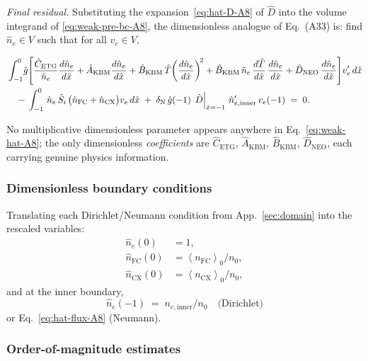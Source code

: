 \documentclass[twocolumn,secnumarabic,amssymb, nobibnotes, aps, prd]{revtex4-2}
\newcommand{\nfc}{n_{\mathrm{FC}}}
\newcommand{\ncx}{n_{\mathrm{CX}}}
\newcommand{\fsa}[1]{\left\langle #1 \right\rangle}
\begin{document}
\textit{Final residual.}
Substituting the expansion~\eqref{eq:hat-D-A8} of $\hat{D}$ into the
volume integrand of \eqref{eq:weak-pre-bc-A8}, the dimensionless
analogue of Eq.~(A33) is: find $\hat{n}_{e}\in V$ such that for all
$v_{e}\in V$,
\begin{widetext}
\begin{align}
  &\int_{-1}^{0}\!\hat{g}\!\left[
       \frac{\hat{C}_{\mathrm{ETG}}}{\hat{n}_{e}}\frac{d\hat{n}_{e}}{d\hat{x}}
     + \hat{A}_{\mathrm{KBM}}\frac{d\hat{n}_{e}}{d\hat{x}}
     + \hat{B}_{\mathrm{KBM}}\,\hat{T}\!\left(\frac{d\hat{n}_{e}}{d\hat{x}}\right)^{\!2}
     + \hat{B}_{\mathrm{KBM}}\,\hat{n}_{e}\,\frac{d\hat{T}}{d\hat{x}}\,\frac{d\hat{n}_{e}}{d\hat{x}}
     + \hat{D}_{\mathrm{NEO}}\,\frac{d\hat{n}_{e}}{d\hat{x}}
  \right]\!v_{e}'\,d\hat{x}
  \notag \\
  & \quad
  -\,\int_{-1}^{0}\,\hat{n}_{e}\,\hat{S}_{i}\,\bigl(\hat{n}_{\mathrm{FC}}+\hat{n}_{\mathrm{CX}}\bigr)v_{e}\,d\hat{x}
  \;+\;\delta_{\mathrm{N}}\,\hat{g}(-1)\,\left.\hat{D}\right|_{\hat{x}=-1}\,\hat{n}'_{e,\mathrm{inner}}\,v_{e}(-1)
  \;=\;0.
  \label{eq:weak-hat-A8}
\end{align}
\end{widetext}
No multiplicative dimensionless parameter appears anywhere in
Eq.~\eqref{eq:weak-hat-A8}; the only dimensionless \emph{coefficients}
are $\hat{C}_{\mathrm{ETG}}$, $\hat{A}_{\mathrm{KBM}}$,
$\hat{B}_{\mathrm{KBM}}$, $\hat{D}_{\mathrm{NEO}}$, each carrying
genuine physics information.

\subsubsection{Dimensionless boundary conditions}

Translating each Dirichlet/Neumann condition from
App.~\ref{sec:domain} into the rescaled variables:
\begin{align}
  \hat{n}_{e}(0)        &= 1, \\
  \hat{n}_{\mathrm{FC}}(0) &= \fsa{\nfc}_{0}/n_{0}, \\
  \hat{n}_{\mathrm{CX}}(0) &= \fsa{\ncx}_{0}/n_{0},
\end{align}
and at the inner boundary,
\begin{equation}
  \hat{n}_{e}(-1) \;=\; n_{e,\mathrm{inner}}/n_{0}
  \quad\text{(Dirichlet)}
\end{equation}
or Eq.~\eqref{eq:hat-flux-A8} (Neumann).

\subsubsection{Order-of-magnitude estimates}
\end{document}
